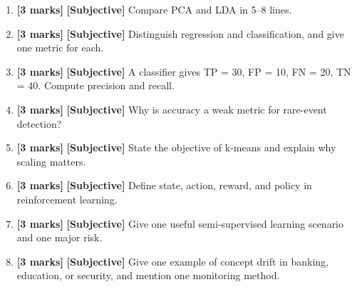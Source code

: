\documentclass[11pt,a4paper]{article}
\newcommand{\MMarks}{\textbf{[3 marks]} }
\begin{document}
\begin{enumerate}[label=\textbf{M\arabic*.}, leftmargin=*]
  \item \MMarks \textbf{[Subjective]} Compare PCA and LDA in 5--8 lines.

  \item \MMarks \textbf{[Subjective]} Distinguish regression and classification, and give one metric for each.

  \item \MMarks \textbf{[Subjective]} A classifier gives TP = 30, FP = 10, FN = 20, TN = 40.
    Compute precision and recall.

  \item \MMarks \textbf{[Subjective]} Why is accuracy a weak metric for rare-event detection?

  \item \MMarks \textbf{[Subjective]} State the objective of k-means and explain why scaling matters.

  \item \MMarks \textbf{[Subjective]} Define state, action, reward, and policy in reinforcement learning.

  \item \MMarks \textbf{[Subjective]} Give one useful semi-supervised learning scenario and one major risk.

  \item \MMarks \textbf{[Subjective]} Give one example of concept drift in banking, education, or security,
    and mention one monitoring method.
\end{enumerate}
\end{document}
